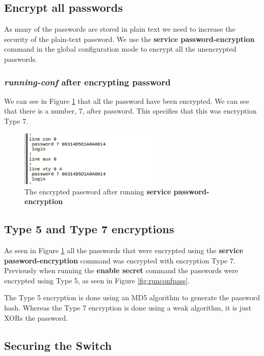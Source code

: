 \documentclass{article}
\begin{document}
\subsection{Encrypt all passwords}

As many of the passwords are stored in plain text we need to increase the security of the plain-text password. We use the \textbf{service password-encryption} command in the global configuration mode to encrypt all the unencrypted passwords. 

\subsubsection{\textit{running-conf} after encrypting password}

We can see in Figure \ref{fig:encpasses} that all the password have been encrypted. We can see that there is a number, 7, after password. This specifies that this was encryption Type 7.  

\begin{figure}[h]
    \centering
    \includegraphics[width=0.6\textwidth]{imgs/encpasses}
    \caption{The encrypted password after running \textbf{service password-encryption}}
    \label{fig:encpasses}
\end{figure}

\subsection{Type 5 and Type 7 encryptions}

As seen in Figure \ref{fig:encpasses} all the passwords that were encrypted using the \textbf{service password-encryption} command was encrypted with encryption Type 7. Previously when running the \textbf{enable secret} command the passwords were encrypted using Type 5, as seen in Figure \ref{fig:runconfpass}.

The Type 5 encryption is done using an MD5 algorithm to generate the password hash. Whereas the Type 7 encryption is done using a weak algorithm, it is just XORs the password.

\subsection{Securing the Switch}
\end{document}

